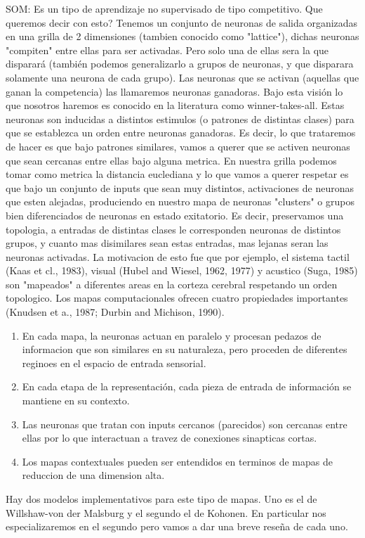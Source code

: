 SOM:
Es un tipo de aprendizaje no supervisado de tipo competitivo. Que queremos decir con esto? Tenemos un conjunto de neuronas de salida organizadas en una grilla de 2 dimensiones (tambien conocido como "lattice"), dichas neuronas "compiten" entre ellas para ser activadas. Pero solo una de ellas sera la que disparará (también podemos generalizarlo a grupos de neuronas, y que disparara solamente una neurona de cada grupo). Las neuronas que se activan (aquellas que ganan la competencia) las llamaremos neuronas ganadoras. Bajo esta visión lo que nosotros haremos es conocido en la literatura como winner-takes-all. Estas neuronas son inducidas a distintos estimulos (o patrones de distintas clases) para que se establezca un orden entre neuronas ganadoras. Es decir, lo que trataremos de hacer es que bajo patrones similares, vamos a querer que se activen neuronas que sean cercanas entre ellas bajo alguna metrica. En nuestra grilla podemos tomar como metrica la distancia euclediana y lo que vamos a querer respetar es que bajo un conjunto de inputs que sean muy distintos, activaciones de neuronas que esten alejadas, produciendo en nuestro mapa de neuronas "clusters" o grupos bien diferenciados de neuronas en estado exitatorio. Es decir, preservamos una topologia, a entradas de distintas clases le corresponden neuronas de distintos grupos, y cuanto mas disimilares sean estas entradas, mas lejanas seran las neuronas activadas. La motivacion de esto fue que por ejemplo, el sistema tactil (Kaas et cl., 1983), visual (Hubel and Wiesel, 1962, 1977) y acustico (Suga, 1985) son "mapeados" a diferentes areas en la corteza cerebral respetando un orden topologico.
Los mapas computacionales ofrecen cuatro propiedades importantes (Knudsen et a., 1987; Durbin and Michison, 1990).
\begin{enumerate}
\item En cada mapa, la neuronas actuan en paralelo y procesan pedazos de informacion que son similares en su naturaleza, pero proceden de diferentes reginoes en el espacio de entrada sensorial.
\item En cada etapa de la representación, cada pieza de entrada de información se mantiene en su contexto.
\item Las neuronas que tratan con inputs cercanos (parecidos) son cercanas entre ellas por lo que interactuan a travez de conexiones sinapticas cortas.
\item Los mapas contextuales pueden ser entendidos en terminos de mapas de reduccion de una dimension alta.
\end{enumerate}
Hay dos modelos implementativos para este tipo de mapas. Uno es el de Willshaw-von der Malsburg y el segundo el de Kohonen. En particular nos especializaremos en el segundo pero vamos a dar una breve reseña de cada uno.

